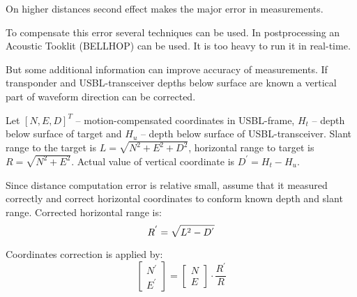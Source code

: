 \documentclass[10pt,letterpaper]{article}
\numberwithin{equation}{section}
\numberwithin{figure}{section}
\numberwithin{table}{section}
\begin{document}
On higher distances second effect makes the major error in measurements.

To compensate this error several techniques can be used. In postprocessing an
Acoustic Tooklit (BELLHOP) can be used. It is too heavy to run it in real-time.

But some additional information can improve accuracy of measurements.
If transponder and USBL-transceiver depths below surface are known a vertical
part of waveform direction can be corrected.

Let $[ N, E, D ]^{T}$ -- motion-compensated coordinates in USBL-frame, $H_{t}$ --
depth below surface of target and $H_{u}$ -- depth below surface of
USBL-transceiver. Slant range to the target is $L = \sqrt{N^2 + E^2 + D^2}$,
horizontal range to target is $R = \sqrt{N^2 + E^2}$. Actual value of vertical
coordinate is $D^{'} = H_{t} - H_{u}$.

Since distance computation error is relative small, assume that it measured
correctly and correct horizontal coordinates to conform known depth and slant range.
Corrected horizontal range is:
\begin{equation}
    R^{'} = \sqrt{L^2 - D^{'}} \\
\end{equation}

Coordinates correction is applied by:
\begin{equation}
    \begin{bmatrix}
        N^{'} \\ E^{'}
    \end{bmatrix} = \begin{bmatrix}
        N \\ E
    \end{bmatrix} \cdot \frac{R^{'}}{R}
\end{equation}


%
%
%
\end{document}
